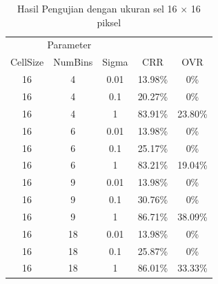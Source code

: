 \begin{longtable}[c]{|c|c|c|c|c|}
	\caption{Hasil Pengujian dengan ukuran sel 16 $\times$ 16 piksel}
	\label{tab:HasilPengujianSel16}\\
	\hline
	\multicolumn{3}{|c|}{Parameter} &                                &                                \\ \cline{1-3}
	CellSize   & NumBins   & Sigma  & \multirow{-2}{*}{CRR}          & \multirow{-2}{*}{OVR}          \\ \hline
	\endhead
	16          & 4         & 0.01   & 13.98\%                        & 0\%                            \\ \hline
	16          & 4         & 0.1    & 20.27\%                        & 0\%                            \\ \hline
	16          & 4         & 1      & 83.91\%                        & 23.80\%                        \\ \hline
	16          & 6         & 0.01   & 13.98\%                        & 0\%                            \\ \hline
	16          & 6         & 0.1    & 25.17\%                        & 0\%                            \\ \hline
	16          & 6         & 1      & 83.21\%                        & 19.04\%                        \\ \hline
	16          & 9         & 0.01   & 13.98\%                        & 0\%                            \\ \hline
	16          & 9         & 0.1    & 30.76\%                        & 0\%                            \\ \hline
	16          & 9         & 1      & {\color[HTML]{FE0000} 86.71\%} & {\color[HTML]{FE0000} 38.09\%} \\ \hline
	16          & 18        & 0.01   & 13.98\%                        & 0\%                            \\ \hline
	16          & 18        & 0.1    & 25.87\%                        & 0\%                            \\ \hline
	16          & 18        & 1      & 86.01\%                        & 33.33\%                        \\ \hline
\end{longtable}
